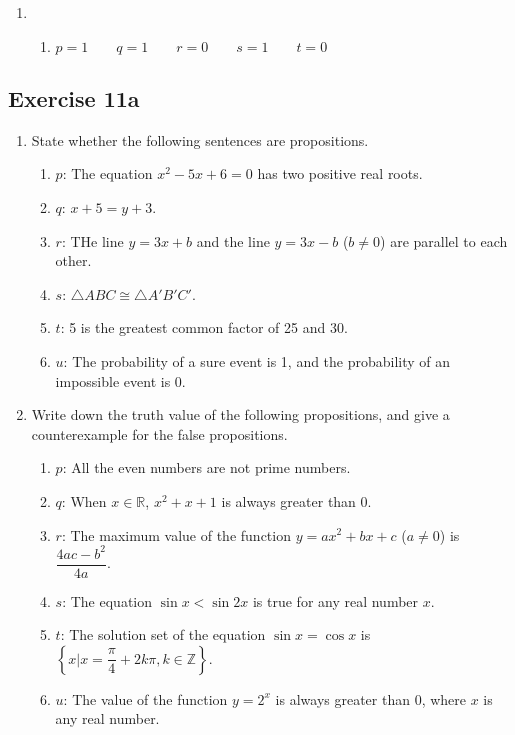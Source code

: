 \documentclass{report}
\begin{document}
\begin{enumerate}[label=\textbf{Sol.}, leftmargin=*]
    \item \begin{enumerate}[label=]
              \item $p = 1 \qquad q = 1 \qquad r = 0 \qquad s = 1 \qquad t = 0$
          \end{enumerate}
\end{enumerate}

\subsection*{Exercise 11a}
\begin{enumerate}[leftmargin=*]
    \item State whether the following sentences are propositions.
          \begin{enumerate}[label=, leftmargin=*]
              \item $p$: The equation $x^2 - 5x + 6 = 0$ has two positive real roots.
              \item $q$: $x + 5 = y + 3$.
              \item $r$: THe line $y = 3x + b$ and the line $y = 3x - b$ ($b \neq 0$) are parallel to each other.
              \item $s$: $\triangle ABC \cong \triangle A'B'C'$.
              \item $t$: 5 is the greatest common factor of 25 and 30.
              \item $u$: The probability of a sure event is 1, and the probability of an impossible event is 0.
          \end{enumerate}
    \item Write down the truth value of the following propositions, and give a
          counterexample for the false propositions.
          \begin{enumerate}[label=, leftmargin=*]
              \item $p$: All the even numbers are not prime numbers.
              \item $q$: When $x \in \mathbb{R}$, $x^2 + x + 1$ is always greater than 0.
              \item $r$: The maximum value of the function $y = ax^2 + bx + c$ ($a \neq 0$) is $\dfrac{4ac - b^2}{4a}$.
              \item $s$: The equation $\sin x < \sin 2x$ is true for any real number $x$.
              \item $t$: The solution set of the equation $\sin x = \cos x$ is $\left\{x | x = \dfrac{\pi}{4} + 2k\pi, k \in \mathbb{Z}\right\}$.
              \item $u$: The value of the function $y = 2^x$ is always greater than 0, where $x$ is any real number.
          \end{enumerate}
\end{enumerate}
\end{document}
